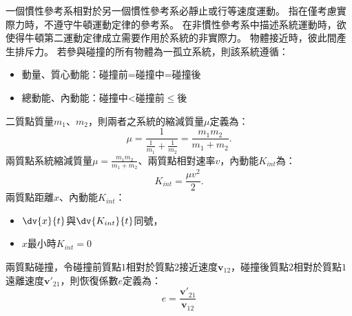 \documentclass[a4paper,12pt]{article}
\begin{document}
一個慣性參考系相對於另一個慣性參考系必靜止或行等速度運動。
指在僅考慮實際力時，不遵守牛頓運動定律的參考系。
在非慣性參考系中描述系統運動時，欲使得牛頓第二運動定律成立需要作用於系統的非實際力。
物體接近時，彼此間產生排斥力。
若參與碰撞的所有物體為一孤立系統，則該系統遵循：
\begin{itemize}
\item 動量、質心動能：碰撞前=碰撞中=碰撞後
\item 總動能、內動能：碰撞中<碰撞前$\leq$後
\end{itemize}
二質點質量$m_1$、$m_2$，則兩者之系統的縮減質量$\mu$定義為：
\[\mu=\frac{1}{\frac{1}{m_1}+\frac{1}{m_2}} = \frac{m_1m_2}{m_1+m_2}.\]
兩質點系統縮減質量$\mu=\frac{m_1m_2}{m_1+m_2}$、兩質點相對速率$v$，內動能$K_{int}$為：
\[K_{int}= \frac{\mu v^2}{2}.\]
兩質點距離$x$、內動能$K_{int}$：
\begin{itemize}
\item $\dv{x}{t}$與$\dv{K_{int}}{t}$同號，
\item $x$最小時$K_{int}=0$
\end{itemize}
兩質點碰撞，令碰撞前質點$1$相對於質點$2$接近速度$\mathbf{v}_{12}$，碰撞後質點$2$相對於質點$1$遠離速度$\mathbf{v}'_{21}$，則恢復係數$e$定義為：
\[e = \frac{\mathbf{v}'_{21}}{\mathbf{v}_{12}} \]
\end{document}
